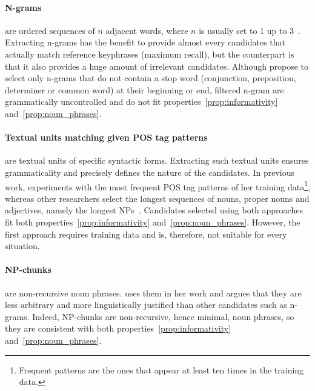   \paragraph{N-grams} are ordered sequences of $n$ adjacent words, where $n$ is
  usually set to 1 up to 3~\cite{witten1999kea}. Extracting n-grams has the
  benefit to provide almost every candidates that actually match reference
  keyphrases (maximum recall), but the counterpart is that it also provides a
  huge amount of irrelevant candidates. Although 
  propose to select only n-grams that do not contain a stop word (conjunction,
  preposition, determiner or common word) at their beginning or end, filtered
  n-gram are grammatically uncontrolled and do not fit
  properties~\ref{prop:informativity} and~\ref{prop:noun_phrases}.

  \paragraph{Textual units matching given POS tag patterns} are textual units of
  specific syntactic forms. Extracting such textual units ensures grammaticality
  and precisely defines the nature of the candidates. In previous work,
   experiments with the most frequent POS
  tag patterns of her training data\footnote{Frequent patterns are the ones that
  appear at least ten times in the training data.}, whereas other researchers
  select the longest sequences of nouns, proper nouns and adjectives, namely
  the longest NPs~\cite{hassan2010conundrums}. Candidates selected using both
  approaches fit both properties~\ref{prop:informativity}
  and~\ref{prop:noun_phrases}. However, the first approach requires training
  data and is, therefore, not suitable for every situation.

  \paragraph{NP-chunks} are non-recursive noun phrases.
   uses them in her work and argues that
  they are less arbitrary and more linguistically justified than other
  candidates such as n-grams. Indeed, NP-chunks are non-recursive, hence
  minimal, noun phrases, so they are consistent with both
  properties~\ref{prop:informativity} and~\ref{prop:noun_phrases}.

